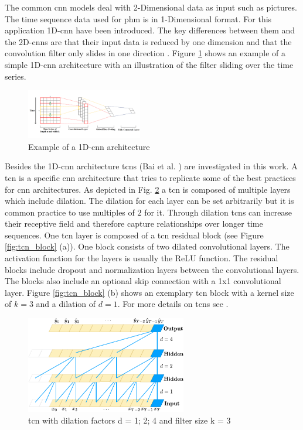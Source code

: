\documentclass[conference]{IEEEtran}
\begin{document}
The common \gls{cnn} models deal with 2-Dimensional data as input such as pictures. The time sequence data used for \gls{phm} is in 1-Dimensional format. For this application 1D-\gls{cnn} have been introduced. The key differences between them and the 2D-\glspl{cnn} are that their input data is reduced by one dimension and that the convolution filter only slides in one direction \cite{Akrim2021}. Figure \ref{fig:1D_cnn_architecture} shows an example of a simple 1D-\gls{cnn} architecture with an illustration of the filter sliding over the time series. 

\begin{figure}[htp]
	\centering
	\includegraphics[width=0.45\textwidth]{1D_CNN_Architecture.png}
	\caption{Example of a 1D-\gls{cnn} architecture \cite{Sayyad}}
	\label{fig:1D_cnn_architecture}
\end{figure}

Besides the 1D-\gls{cnn} architecture \glspl{tcn} (Bai et al. \cite{Bai2018}) are investigated in this work. A \gls{tcn} is a specific \gls{cnn} architecture that tries to replicate some of the best practices for \gls{cnn} architectures. As depicted in Fig. \ref{fig:tcn_architecture} a \gls{tcn} is composed of multiple layers which include dilation. The dilation for each layer can be set arbitrarily but it is common practice to use multiples of $ 2 $ for it. Through dilation \glspl{tcn} can increase their receptive field and therefore capture relationships over longer time sequences. One \gls{tcn} layer is composed of a \gls{tcn} residual block (see Figure \ref{fig:tcn_block} (a)). One block consists of two dilated convolutional layers. The activation function for the layers is usually the ReLU function. The residual blocks include dropout and normalization layers between the convolutional layers. The blocks also include an optional skip connection with a 1x1 convolutional layer. Figure \ref{fig:tcn_block} (b) shows an exemplary \gls{tcn} block with a kernel size of $ k = 3 $ and a dilation of $ d = 1 $. For more details on \glspl{tcn} see \cite{Bai2018}.

\begin{figure}[htp]
	\centering
	\includegraphics[width=7cm]{tcn_architecture.pdf}
	\caption{\gls{tcn} with dilation factors d = 1; 2; 4 and filter size k = 3 \cite{Bai2018}}
	\label{fig:tcn_architecture}
\end{figure}
\end{document}
